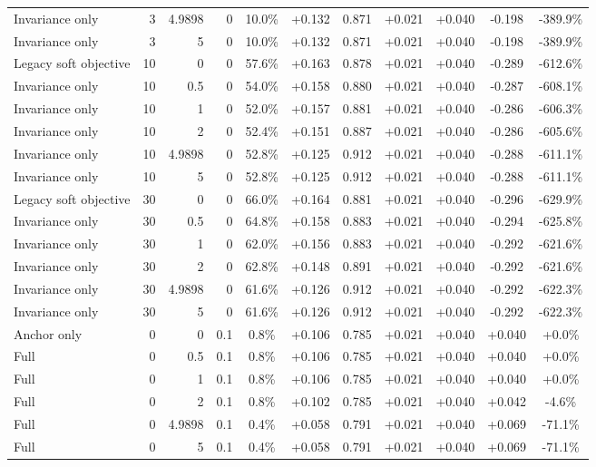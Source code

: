 \begin{table}[htbp]
\begin{tabular}{lrrrccccccc}
Invariance only & 3 & 4.9898 & 0 & 10.0\% & +0.132 & 0.871 & +0.021 & +0.040 & -0.198 & -389.9\% \\
Invariance only & 3 & 5 & 0 & 10.0\% & +0.132 & 0.871 & +0.021 & +0.040 & -0.198 & -389.9\% \\
Legacy soft objective & 10 & 0 & 0 & 57.6\% & +0.163 & 0.878 & +0.021 & +0.040 & -0.289 & -612.6\% \\
Invariance only & 10 & 0.5 & 0 & 54.0\% & +0.158 & 0.880 & +0.021 & +0.040 & -0.287 & -608.1\% \\
Invariance only & 10 & 1 & 0 & 52.0\% & +0.157 & 0.881 & +0.021 & +0.040 & -0.286 & -606.3\% \\
Invariance only & 10 & 2 & 0 & 52.4\% & +0.151 & 0.887 & +0.021 & +0.040 & -0.286 & -605.6\% \\
Invariance only & 10 & 4.9898 & 0 & 52.8\% & +0.125 & 0.912 & +0.021 & +0.040 & -0.288 & -611.1\% \\
Invariance only & 10 & 5 & 0 & 52.8\% & +0.125 & 0.912 & +0.021 & +0.040 & -0.288 & -611.1\% \\
Legacy soft objective & 30 & 0 & 0 & 66.0\% & +0.164 & 0.881 & +0.021 & +0.040 & -0.296 & -629.9\% \\
Invariance only & 30 & 0.5 & 0 & 64.8\% & +0.158 & 0.883 & +0.021 & +0.040 & -0.294 & -625.8\% \\
Invariance only & 30 & 1 & 0 & 62.0\% & +0.156 & 0.883 & +0.021 & +0.040 & -0.292 & -621.6\% \\
Invariance only & 30 & 2 & 0 & 62.8\% & +0.148 & 0.891 & +0.021 & +0.040 & -0.292 & -621.6\% \\
Invariance only & 30 & 4.9898 & 0 & 61.6\% & +0.126 & 0.912 & +0.021 & +0.040 & -0.292 & -622.3\% \\
Invariance only & 30 & 5 & 0 & 61.6\% & +0.126 & 0.912 & +0.021 & +0.040 & -0.292 & -622.3\% \\
Anchor only & 0 & 0 & 0.1 & 0.8\% & +0.106 & 0.785 & +0.021 & +0.040 & +0.040 & +0.0\% \\
Full & 0 & 0.5 & 0.1 & 0.8\% & +0.106 & 0.785 & +0.021 & +0.040 & +0.040 & +0.0\% \\
Full & 0 & 1 & 0.1 & 0.8\% & +0.106 & 0.785 & +0.021 & +0.040 & +0.040 & +0.0\% \\
Full & 0 & 2 & 0.1 & 0.8\% & +0.102 & 0.785 & +0.021 & +0.040 & +0.042 & -4.6\% \\
Full & 0 & 4.9898 & 0.1 & 0.4\% & +0.058 & 0.791 & +0.021 & +0.040 & +0.069 & -71.1\% \\
Full & 0 & 5 & 0.1 & 0.4\% & +0.058 & 0.791 & +0.021 & +0.040 & +0.069 & -71.1\% \\

\end{tabular}
\end{table}
